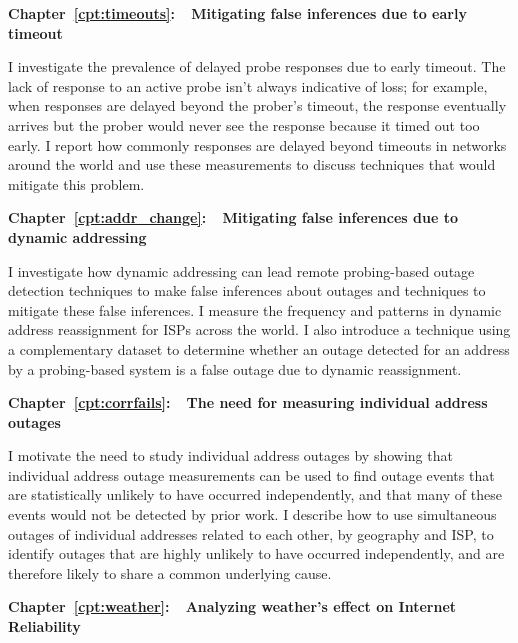 \textbf{Chapter~\ref{cpt:timeouts}:~~Mitigating false inferences due
to early timeout} 

I investigate the
prevalence of delayed probe responses due to early timeout. The lack
of response to an active probe isn't always indicative of loss; for
example, when responses are delayed beyond the prober's timeout, the
response eventually arrives but the prober would never see the
response because it timed out too early. I report how commonly
responses are delayed beyond timeouts in networks around the world and
use these measurements to discuss techniques that would mitigate this problem.

\textbf{Chapter~\ref{cpt:addr_change}:~~Mitigating false inferences due to dynamic addressing} 

I investigate how dynamic addressing can lead remote probing-based
outage detection techniques to make false inferences about outages and
techniques to mitigate these false inferences. I measure the frequency
and patterns in dynamic address reassignment for ISPs across the
world.  I also introduce a technique using a complementary dataset to
determine whether an outage detected for an address by a probing-based
system is a false outage due to dynamic reassignment. %

\textbf{Chapter~\ref{cpt:corrfails}:~~The need for measuring individual address outages} 

I motivate the need to study individual address outages by showing
that individual address outage measurements can be used to find outage
events that are statistically unlikely to have occurred independently, and that many of these events
would not be detected by prior work. I describe how to use
simultaneous outages of individual addresses related to each other, by
geography and ISP, to identify outages that are highly unlikely to have
occurred independently, and are therefore likely to share a common
underlying cause.

\textbf{Chapter~\ref{cpt:weather}:~~Analyzing weather's effect on
  Internet Reliability} 

